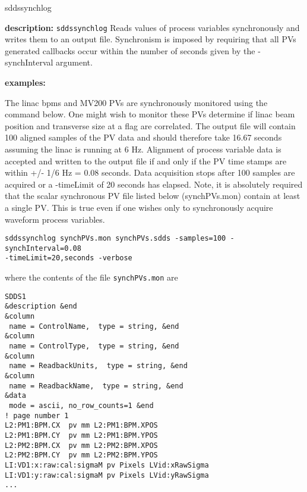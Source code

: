 \begin{sddsprog}{sddssynchlog}
\item \textbf{description:}
\verb+sddssynchlog+ Reads values of process variables synchronously
and writes them to an output file.  Synchronism is imposed by
requiring that all PVs generated callbacks occur within the number of
seconds given by the -synchInterval argument.
\item \textbf{examples:}

The linac bpms and MV200 PVs are synchronously monitored using the
command below.  One might wish to monitor these PVs determine if linac
beam position and transverse size at a flag are correlated.  The
output file will contain 100 aligned samples of the PV data and should
therefore take 16.67 seconds assuming the linac is running at 6 Hz.
Alignment of process variable data is accepted and written to the
output file if and only if the PV time stamps are within +/- 1/6 Hz =
0.08 seconds.  Data acquisition stops after 100 samples are acquired
or a -timeLimit of 20 seconds has elapsed.  Note, it is absolutely
required that the scalar synchronous PV file listed below
(synchPVs.mon) contain at least a single PV.  This is true even if one
wishes only to synchronously acquire waveform process variables.
\begin{verbatim}
sddssynchlog synchPVs.mon synchPVs.sdds -samples=100 -synchInterval=0.08
-timeLimit=20,seconds -verbose
\end{verbatim}
where the contents of the file \verb+synchPVs.mon+ are
\begin{verbatim}
SDDS1
&description &end
&column
 name = ControlName,  type = string, &end
&column
 name = ControlType,  type = string, &end
&column
 name = ReadbackUnits,  type = string, &end
&column
 name = ReadbackName,  type = string, &end
&data
 mode = ascii, no_row_counts=1 &end
! page number 1
L2:PM1:BPM.CX  pv mm L2:PM1:BPM.XPOS
L2:PM1:BPM.CY  pv mm L2:PM1:BPM.YPOS
L2:PM2:BPM.CX  pv mm L2:PM2:BPM.XPOS
L2:PM2:BPM.CY  pv mm L2:PM2:BPM.YPOS
LI:VD1:x:raw:cal:sigmaM pv Pixels LVid:xRawSigma
LI:VD1:y:raw:cal:sigmaM pv Pixels LVid:yRawSigma
...

\end{verbatim}


\end{sddsprog}
